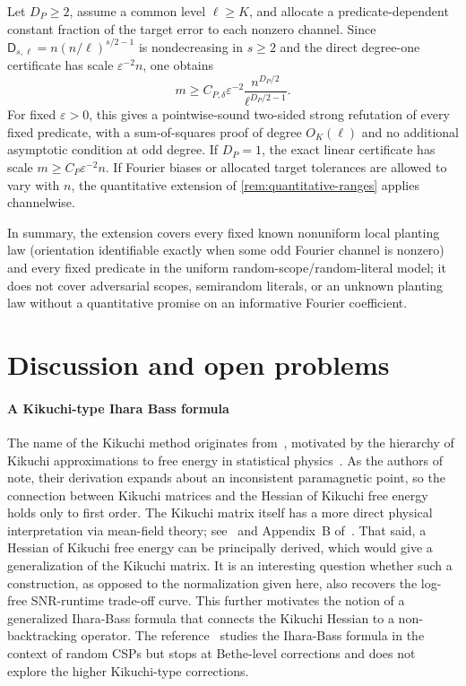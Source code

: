 \documentclass[11pt]{article}
\theoremstyle{definition}
\theoremstyle{remark}
\newcommand{\1}{\mathbf 1}
\newcommand{\eps}{\varepsilon}
\numberwithin{equation}{section}
\begin{document}
Let $D_P\ge2$, assume a common level $\ell\ge K$, and allocate a
predicate-dependent constant fraction of the target error to each
nonzero channel.  Since $\mathsf D_{s,\ell}=n(n/\ell)^{s/2-1}$ is
nondecreasing in $s\ge2$ and the direct degree-one certificate has
scale $\eps^{-2}n$, one obtains
\begin{equation}\label{eq:csp-refutation-curve}
 m\ge C_{P,\delta}\eps^{-2}
       \frac{n^{D_P/2}}{\ell^{D_P/2-1}}.
\end{equation}
For fixed $\eps>0$, this gives a pointwise-sound two-sided strong
refutation of every fixed predicate, with a sum-of-squares proof of
degree $O_K(\ell)$ and no additional asymptotic condition at odd
degree.  If $D_P=1$, the exact linear certificate has scale
$m\ge C_P\eps^{-2}n$.  If Fourier biases or allocated target
tolerances are allowed to vary with $n$, the quantitative extension of
\cref{rem:quantitative-ranges} applies channelwise.

In summary, the extension covers every fixed known nonuniform local
planting law (orientation identifiable exactly when some odd Fourier
channel is nonzero) and every fixed predicate in the uniform
random-scope/random-literal model; it does not cover adversarial
scopes, semirandom literals, or an unknown planting law without a
quantitative promise on an informative Fourier coefficient.

\section{Discussion and open problems}\label{sec:discussion}
\paragraph{A Kikuchi-type Ihara Bass formula}
The name of the Kikuchi method originates from~\cite{WEM}, motivated by the hierarchy of
Kikuchi approximations to free energy in statistical physics~\cite{Kikuchi1951}.  As the authors
of~\cite{WEM} note, their derivation expands about an inconsistent paramagnetic
point, so the connection between Kikuchi matrices and the Hessian of Kikuchi
free energy holds only to first order.  The Kikuchi matrix itself has a more direct physical interpretation
via mean-field theory; see~\cite{Hastings2019} and Appendix~B
of~\cite{SOKB}. That said, a Hessian of Kikuchi free energy can be principally derived, which would give a generalization of the Kikuchi matrix. It is an interesting question whether such a construction, as opposed to the normalization given here, also recovers the log-free SNR-runtime trade-off curve. This further motivates the notion of a generalized Ihara-Bass formula that connects the Kikuchi Hessian to a non-backtracking operator. The reference~\cite{dOrsiTrevisan} studies the Ihara-Bass formula in the context of random CSPs but stops at Bethe-level corrections and does not explore the higher Kikuchi-type corrections. 
\end{document}

